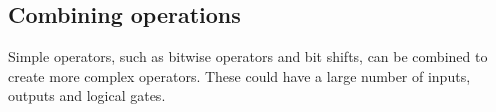 
\subsection{Combining operations}

Simple operators, such as bitwise operators and bit shifts, can be combined to create more complex operators. These could have a large number of inputs, outputs and logical gates.

